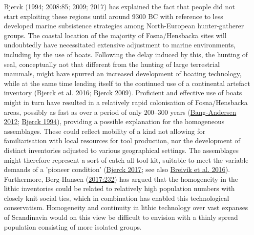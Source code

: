 \documentclass[
  a4paper,
  oneside]{uiophdthesis}
\begin{document}
Bjerck (\protect\hyperlink{ref-bjerck1994}{1994}; \protect\hyperlink{ref-bjerck2008}{2008:85}; \protect\hyperlink{ref-bjerck2009}{2009}; \protect\hyperlink{ref-bjerck2017}{2017}) has explained the fact that people did not start exploiting these regions until around 9300 BC with reference to less developed marine subsistence strategies among North-European hunter-gatherer groups. The coastal location of the majority of Fosna/Hensbacka sites will undoubtedly have necessitated extensive adjustment to marine environments, including by the use of boats. Following the delay induced by this, the hunting of seal, conceptually not that different from the hunting of large terrestrial mammals, might have spurred an increased development of boating technology, while at the same time lending itself to the continued use of a continental artefact inventory (\protect\hyperlink{ref-bjerck2016}{Bjerck et al. 2016}; \protect\hyperlink{ref-bjerck2009}{Bjerck 2009}). Proficient and effective use of boats might in turn have resulted in a relatively rapid colonisation of Fosna/Hensbacka areas, possibly as fast as over a period of only 200--300 years (\protect\hyperlink{ref-bang-andersen2012}{Bang-Andersen 2012}; \protect\hyperlink{ref-bjerck1994}{Bjerck 1994}), providing a possible explanation for the homogeneous assemblages. These could reflect mobility of a kind not allowing for familiarisation with local resources for tool production, nor the development of distinct inventories adjusted to various geographical settings. The assemblages might therefore represent a sort of catch-all tool-kit, suitable to meet the variable demands of a 'pioneer condition' (\protect\hyperlink{ref-bjerck2017}{Bjerck 2017}; see also \protect\hyperlink{ref-breivik2016}{Breivik et al. 2016}). Furthermore, Berg-Hansen (\protect\hyperlink{ref-berg-hansen2017}{2017:232}) has argued that the homogeneity in the lithic inventories could be related to relatively high population numbers with closely knit social ties, which in combination has enabled this technological conservatism. Homogeneity and continuity in lithic technology over vast expanses of Scandinavia would on this view be difficult to envision with a thinly spread population consisting of more isolated groups.
\end{document}
